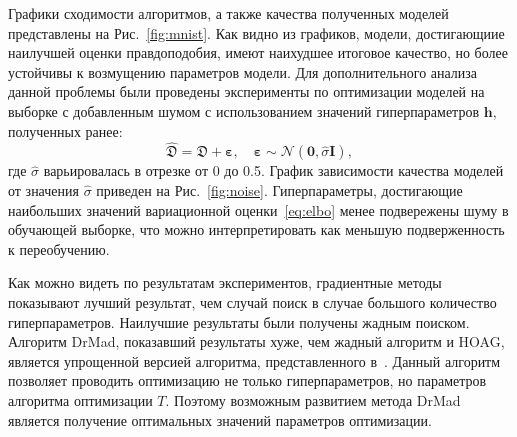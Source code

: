 Графики сходимости алгоритмов, а также качества полученных моделей представлены на Рис.~\ref{fig:mnist}.
Как видно из графиков, модели, достигающиие наилучшей оценки правдоподобия, имеют наихудшее итоговое качество, но более устойчивы к возмущению параметров модели. Для дополнительного анализа данной проблемы были проведены эксперименты по оптимизации моделей на выборке с добавленным шумом с использованием значений гиперпараметров $\mathbf{h}$, полученных ранее:
\[
    \hat{\mathfrak{D}} = \mathfrak{D} + \boldsymbol{\varepsilon}, \quad   \boldsymbol{\varepsilon} \sim \mathcal{N}(\mathbf{0}, \hat{\sigma}\mathbf{I}),
\]
где $\hat{\sigma}$ варьировалась в отрезке от 0 до 0.5.
График зависимости качества моделей от значения $\hat{\sigma}$ приведен на Рис.~\ref{fig:noise}.  Гиперпараметры, достигающие наибольших значений вариационной оценки~\eqref{eq:elbo} менее подвережены шуму в обучающей выборке, что можно интерпретировать как меньшую подверженность к переобучению.

Как можно видеть по результатам экспериментов, градиентные методы показывают лучший результат, чем случай поиск в случае большого количество гиперпараметров. Наилучшие результаты были получены жадным поиском. Алгоритм DrMad, показавший результаты хуже, чем жадный алгоритм и HOAG, является упрощенной версией алгоритма, представленного в~\cite{hyper_mad}. Данный алгоритм позволяет проводить оптимизацию не только гиперпараметров, но параметров алгоритма оптимизации $T$. Поэтому возможным развитием  метода DrMad является получение оптимальных значений параметров оптимизации.


